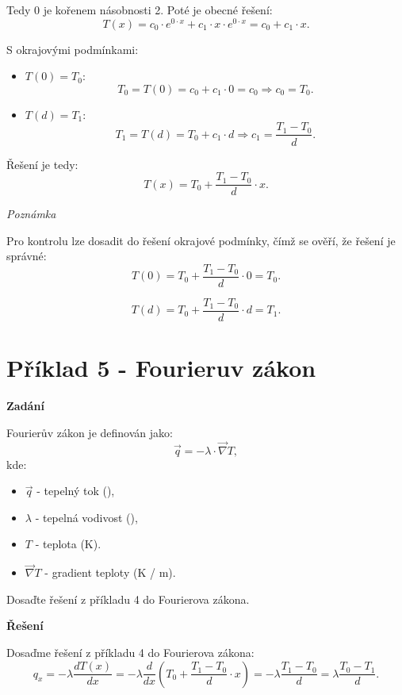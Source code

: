 \documentclass{article}
\begin{document}
Tedy 0 je kořenem násobnosti 2. Poté je obecné řešení:
$$
    T(x) = c_0 \cdot e^{0 \cdot x} + c_1 \cdot x \cdot e^{0 \cdot x} = c_0 + c_1 \cdot x.
$$

S okrajovými podmínkami:
\begin{itemize}
    \item $T(0) = T_0$:
          $$
              T_0 = T(0) = c_0 + c_1 \cdot 0 = c_0 \Rightarrow c_0 = T_0.
          $$
    \item $T(d) = T_1$:
          $$
              T_1 = T(d) = T_0 + c_1 \cdot d \Rightarrow c_1 = \frac{T_1 - T_0}{d}.
          $$
\end{itemize}

Řešení je tedy:
$$
    T(x) = T_0 + \frac{T_1 - T_0}{d} \cdot x.
$$

\textit{Poznámka}

Pro kontrolu lze dosadit do řešení okrajové podmínky, čímž se ověří, že řešení je správné:
$$
    T(0) = T_0 + \frac{T_1 - T_0}{d} \cdot 0 = T_0.
$$

$$
    T(d) = T_0 + \frac{T_1 - T_0}{d} \cdot d = T_1.
$$



\section*{Příklad 5 - Fourieruv zákon}

\textbf{Zadání}

Fourierův zákon je definován jako:
\begin{equation}
    \vec{q} = - \lambda \cdot \vec{\nabla} T,
\end{equation}
kde:
\begin{itemize}
    \item $\vec{q}$ - tepelný tok (\ueqWandMinvsq),
    \item $\lambda$ - tepelná vodivost (\ueqWandMinvsqKinv),
    \item $T$ - teplota (K).
    \item $\vec{\nabla} T$ - gradient teploty (K / m).
\end{itemize}

Dosaďte řešení z příkladu 4 do Fourierova zákona.

\textbf{Řešení}

Dosaďme řešení z příkladu 4 do Fourierova zákona:
$$
    q_x = - \lambda  \frac{dT(x)}{dx} = - \lambda  \frac{d}{dx} \left( T_0 + \frac{T_1 - T_0}{d} \cdot x \right) = - \lambda  \frac{T_1 - T_0}{d} = \lambda  \frac{T_0 - T_1}{d}.
$$
\end{document}
